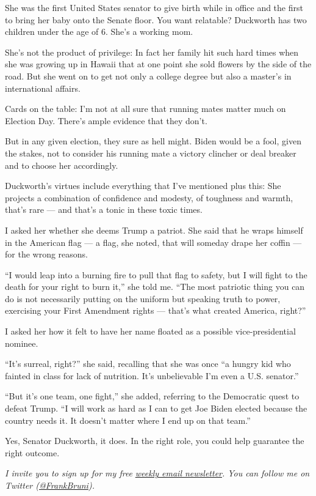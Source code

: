 She was the first United States senator to give birth while in office
and the first to bring her baby onto the Senate floor. You want
relatable? Duckworth has two children under the age of 6. She's a
working mom.

She's not the product of privilege: In fact her family hit such hard
times when she was growing up in Hawaii that at one point she sold
flowers by the side of the road. But she went on to get not only a
college degree but also a master's in international affairs.

Cards on the table: I'm not at all sure that running mates matter much
on Election Day. There's ample evidence that they don't.

But in any given election, they sure as hell might. Biden would be a
fool, given the stakes, not to consider his running mate a victory
clincher or deal breaker and to choose her accordingly.

Duckworth's virtues include everything that I've mentioned plus this:
She projects a combination of confidence and modesty, of toughness and
warmth, that's rare --- and that's a tonic in these toxic times.

I asked her whether she deems Trump a patriot. She said that he wraps
himself in the American flag --- a flag, she noted, that will someday
drape her coffin --- for the wrong reasons.

``I would leap into a burning fire to pull that flag to safety, but I
will fight to the death for your right to burn it,'' she told me. ``The
most patriotic thing you can do is not necessarily putting on the
uniform but speaking truth to power, exercising your First Amendment
rights --- that's what created America, right?''

I asked her how it felt to have her name floated as a possible
vice-presidential nominee.

``It's surreal, right?'' she said, recalling that she was once ``a
hungry kid who fainted in class for lack of nutrition. It's unbelievable
I'm even a U.S. senator.''

``But it's one team, one fight,'' she added, referring to the Democratic
quest to defeat Trump. ``I will work as hard as I can to get Joe Biden
elected because the country needs it. It doesn't matter where I end up
on that team.''

Yes, Senator Duckworth, it does. In the right role, you could help
guarantee the right outcome.

\emph{I invite you to sign up for my free}
\href{https://www.nytimes3xbfgragh.onion/newsletters/frank-bruni}{\emph{weekly
email newsletter}}\emph{. You can follow me on Twitter
(}\href{https://twitter.com/FrankBruni}{\emph{@FrankBruni}}\emph{).}

